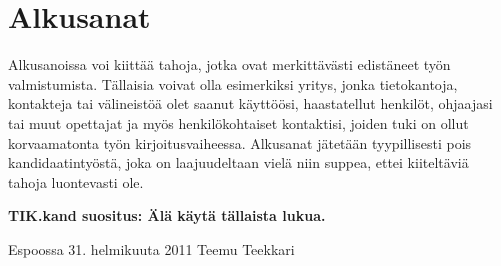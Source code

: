 %
%


\section*{Alkusanat}

Alkusanoissa voi kiittää tahoja, jotka ovat merkittävästi edistäneet
työn valmistumista. Tällaisia voivat olla esimerkiksi yritys, jonka
tietokantoja, kontakteja tai välineistöä olet saanut käyttöösi,
haastatellut henkilöt, ohjaajasi tai muut opettajat ja myös
henkilökohtaiset kontaktisi, joiden tuki on ollut korvaamatonta työn
kirjoitusvaiheessa. Alkusanat jätetään tyypillisesti pois
kandidaatintyöstä, joka on laajuudeltaan vielä niin suppea, ettei
kiiteltäviä tahoja luontevasti ole.

\textbf{TIK.kand suositus: Älä käytä tällaista lukua.}

\vskip 10mm
Espoossa 31. helmikuuta 2011
\vskip 15mm
Teemu Teekkari

